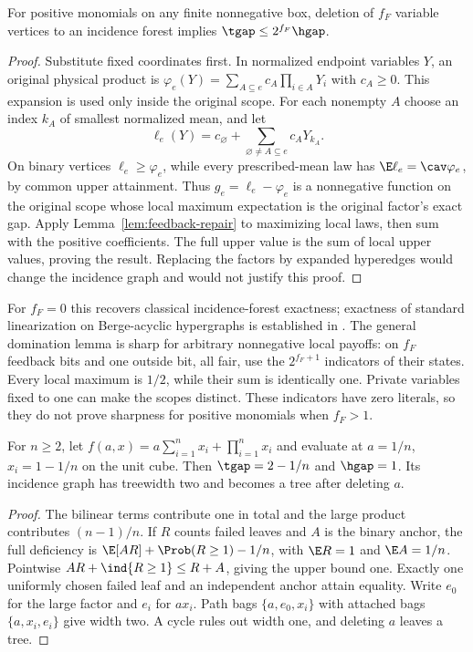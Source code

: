 \begin{theorem}\label{thm:feedback}
For positive monomials on any finite nonnegative box, deletion of $f_F$
variable vertices to an incidence forest implies $\tgap\le2^{f_F}\hgap$.
\end{theorem}
\begin{proof}
Substitute fixed coordinates first. In normalized endpoint variables $Y$,
an original physical product is $\varphi_e(Y)=\sum_{A\subseteq e}
c_A\prod_{i\in A}Y_i$ with $c_A\ge0$. This expansion is used only
inside the original scope. For each nonempty $A$ choose an index $k_A$
of smallest normalized mean, and let
\[
 \ell_e(Y)=c_\varnothing+\sum_{\varnothing\ne A\subseteq e}c_AY_{k_A}.
\]
On binary vertices $\ell_e\ge\varphi_e$, while every prescribed-mean
law has $\E\ell_e=\cav\varphi_e$, by common upper attainment.
Thus $g_e=\ell_e-\varphi_e$ is a nonnegative function on the original
scope whose local maximum expectation is the original factor's exact
gap. Apply Lemma~\ref{lem:feedback-repair} to maximizing local laws,
then sum with the positive coefficients. The full upper value is the
sum of local upper values, proving the result. Replacing the factors by
expanded hyperedges would change the incidence graph and would not
justify this proof.
\end{proof}

For $f_F=0$ this recovers classical incidence-forest exactness; exactness
of standard linearization on Berge-acyclic hypergraphs is established
in \citet{DelPiaKhajavirad2018}. The general domination lemma is sharp
for arbitrary nonnegative local payoffs: on $f_F$ feedback bits and one
outside bit, all fair, use the $2^{f_F+1}$ indicators of their states.
Every local maximum is $1/2$, while their sum is identically one.
Private variables fixed to one can make the scopes distinct. These
indicators have zero literals, so they do not prove sharpness for positive
monomials when $f_F>1$.

\begin{proposition}\label{prop:feedback-sharp}
For $n\ge2$, let $f(a,x)=a\sum_{i=1}^nx_i+\prod_{i=1}^nx_i$ and evaluate
at $a=1/n$, $x_i=1-1/n$ on the unit cube. Then
$\tgap=2-1/n$ and $\hgap=1$. Its incidence graph has treewidth two and
becomes a tree after deleting $a$.
\end{proposition}
\begin{proof}
The bilinear terms contribute one in total and the large product
contributes $(n-1)/n$. If $R$ counts failed leaves and $A$ is the
binary anchor, the full deficiency is
$\E[AR]+\Prob(R\ge1)-1/n$, with $\E R=1$ and $\E A=1/n$.
Pointwise $AR+\ind\{R\ge1\}\le R+A$, giving the upper bound one.
Exactly one uniformly chosen failed leaf and an independent anchor
attain equality. Write $e_0$ for the large factor and $e_i$ for $ax_i$.
Path bags $\{a,e_0,x_i\}$ with attached bags $\{a,x_i,e_i\}$ give width
two. A cycle rules out width one, and deleting $a$ leaves a tree.
\end{proof}

